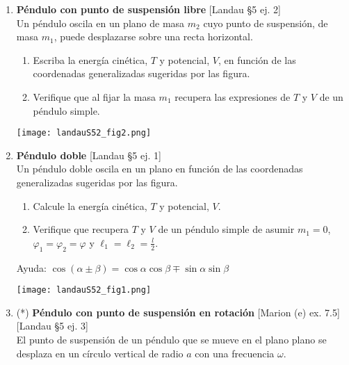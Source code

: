\documentclass[11pt, spanish, a4paper, twoside]{article}
\begin{document}
\begin{enumerate}
\item \begin{minipage}[t][4cm]{0.7\textwidth}
\textbf{Péndulo con punto de suspensión libre} [Landau \S5 ej. 2]\\
Un péndulo oscila en un plano de masa \(m_2\) cuyo punto de suspensión, de masa \(m_1\), puede desplazarse sobre una recta horizontal.
\begin{enumerate}
	\item Escriba la energía cinética, \(T\) y potencial, \(V\), en función de las coordenadas generalizadas sugeridas por las figura.
	\item Verifique que al fijar la masa \(m_1\) recupera las expresiones de \(T\) y \(V\) de un péndulo simple.
\end{enumerate}
\end{minipage}
\begin{minipage}[c][1cm][t]{0.3\textwidth}
        \texttt{[image: landauS52\_fig2.png]}
\end{minipage}



\item \begin{minipage}[t][4cm]{0.7\textwidth}
\textbf{Péndulo doble} [Landau \S5 ej. 1]\\
Un péndulo doble oscila en un plano en función de las coordenadas generalizadas sugeridas por las figura.
\begin{enumerate}
	\item Calcule la energía cinética, \(T\) y potencial, \(V\).
	\item Verifique que recupera \(T\) y \(V\) de un péndulo simple de asumir \(m_1=0\), \(\varphi_1 = \varphi_2 = \varphi\) y \(\ell_1 = \ell_2 = \frac{l}{2}\).
\end{enumerate}
Ayuda: \( \cos(\alpha \pm \beta) = \cos{ \alpha} \cos{ \beta \mp \sin \alpha} \sin{ \beta } \)
\end{minipage}
\begin{minipage}[c][0.5cm][t]{0.3\textwidth}
	\texttt{[image: landauS52\_fig1.png]}
\end{minipage}



\item \begin{minipage}[t][7cm]{0.5\textwidth}
(*) \textbf{Péndulo con punto de suspensión en rotación} [Marion (e) ex. 7.5] [Landau \S5 ej. 3]\\
El punto de suspensión de un péndulo que se mueve en el plano plano se desplaza en un círculo vertical de radio \(a\) con una frecuencia \(\omega\).


\end{minipage}
\end{enumerate}
\end{document}
